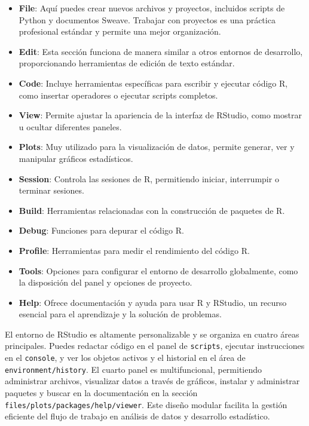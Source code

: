 \documentclass[12pt]{report}\usepackage[]{graphicx}\usepackage[dvipsnames]{xcolor}
\begin{document}
	\begin{itemize}
	
	\item \textbf{File}: Aquí puedes crear nuevos archivos y proyectos, incluidos scripts de Python y documentos Sweave. Trabajar con proyectos es una práctica profesional estándar y permite una mejor organización.
	
	\item \textbf{Edit}: Esta sección funciona de manera similar a otros entornos de desarrollo, proporcionando herramientas de edición de texto estándar.
	
	\item \textbf{Code}: Incluye herramientas específicas para escribir y ejecutar código R, como insertar operadores o ejecutar scripts completos.
	
	\item \textbf{View}: Permite ajustar la apariencia de la interfaz de RStudio, como mostrar u ocultar diferentes paneles.
	
	\item \textbf{Plots}: Muy utilizado para la visualización de datos, permite generar, ver y manipular gráficos estadísticos.
	
	\item \textbf{Session}: Controla las sesiones de R, permitiendo iniciar, interrumpir o terminar sesiones.
	
	\item \textbf{Build}: Herramientas relacionadas con la construcción de paquetes de R.
	
	\item \textbf{Debug}: Funciones para depurar el código R.
	
	\item \textbf{Profile}: Herramientas para medir el rendimiento del código R.
	
	\item \textbf{Tools}: Opciones para configurar el entorno de desarrollo globalmente, como la disposición del panel y opciones de proyecto.
	
	\item \textbf{Help}: Ofrece documentación y ayuda para usar R y RStudio, un recurso esencial para el aprendizaje y la solución de problemas.
	
	\end{itemize}
		
	El entorno de RStudio es altamente personalizable y se organiza en cuatro áreas principales. Puedes redactar código en el panel de \texttt{scripts}, ejecutar instrucciones en el \texttt{console}, y ver los objetos activos y el historial en el área de \texttt{environment/history}. El cuarto panel es multifuncional, permitiendo administrar archivos, visualizar datos a través de gráficos, instalar y administrar paquetes y buscar en la documentación en la sección \texttt{files/plots/packages/help/viewer}. Este diseño modular facilita la gestión eficiente del flujo de trabajo en análisis de datos y desarrollo estadístico.
	
\end{document}
